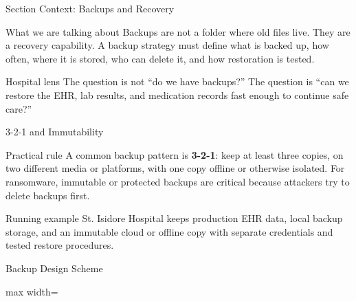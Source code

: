 \documentclass[presentation]{beamer}
\newcommand{\scenario}{St. Isidore Hospital}
\begin{document}
\begin{frame}[c]{Section Context: Backups and Recovery}
\begin{block}{What we are talking about}
Backups are not a folder where old files live. They are a recovery capability. A backup strategy
must define what is backed up, how often, where it is stored, who can delete it, and how restoration
is tested.
\end{block}

\begin{exampleblock}{Hospital lens}
The question is not ``do we have backups?'' The question is ``can we restore the EHR, lab results,
and medication records fast enough to continue safe care?''
\end{exampleblock}
\end{frame}

\begin{frame}[c]{3-2-1 and Immutability}
\begin{block}{Practical rule}
A common backup pattern is \textbf{3-2-1}: keep at least three copies, on two different media or
platforms, with one copy offline or otherwise isolated. For ransomware, immutable or protected
backups are critical because attackers try to delete backups first.
\end{block}

\begin{exampleblock}{Running example}
\scenario{} keeps production EHR data, local backup storage, and an immutable cloud or offline copy
with separate credentials and tested restore procedures.
\end{exampleblock}
\end{frame}

\begin{frame}[c]{Backup Design Scheme}
\begin{center}
\begin{adjustbox}{max width=\textwidth}
\end{adjustbox}
\end{center}
\end{frame}
\end{document}
